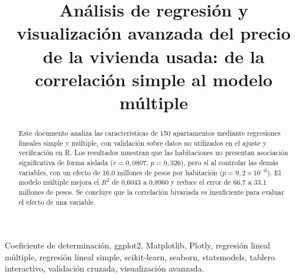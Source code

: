 \documentclass[conference]{IEEEtran}
\begin{document}
    \raggedbottom

    \title{
        Análisis de regresión y visualización avanzada del precio de la vivienda
        usada: de la correlación simple al modelo múltiple
    }

    \author{
    }

    \maketitle
    \thispagestyle{plain}

    \begin{abstract}
        Este documento analiza las características de 150 apartamentos mediante 
        regresiones lineales simple y múltiple, con validación sobre datos no 
        utilizados en el ajuste y verificación en R. Los resultados muestran 
        que las habitaciones no presentan asociación significativa de forma 
        aislada ($r = 0{,}0807$, $p = 0{,}326$), pero sí al controlar las demás
        variables, con un efecto de 16,0 millones de pesos por habitación 
        ($p=9{,}2\times10^{-6}$). El modelo múltiple mejora el $R^2$ de 0,6043 
        a 0,8960 y reduce el error de 66,7 a 33,1 millones de pesos. Se concluye 
        que la correlación bivariada es insuficiente para evaluar el efecto 
        de una variable.
    \end{abstract}

    \vspace{10pt}

    \begin{IEEEkeywords}
        Coeficiente de determinación, ggplot2, Matplotlib, Plotly, regresión
        lineal múltiple, regresión lineal simple, scikit-learn, seaborn,
        statsmodels, tablero interactivo, validación cruzada, visualización
        avanzada.
    \end{IEEEkeywords}

    
    
    
    

    \appendices
    
    

    
    
\end{document}
